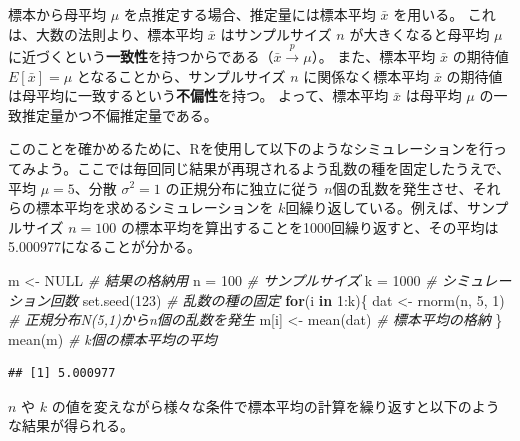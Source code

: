 \documentclass[
  ja=standard, xelatex, base=12pt]{bxjsreport}
\newenvironment{Shaded}{\begin{snugshade}}{\end{snugshade}}
\newcommand{\CommentTok}[1]{\textcolor[rgb]{0.56,0.35,0.01}{\textit{#1}}}
\newcommand{\ConstantTok}[1]{\textcolor[rgb]{0.00,0.00,0.00}{#1}}
\newcommand{\ControlFlowTok}[1]{\textcolor[rgb]{0.13,0.29,0.53}{\textbf{#1}}}
\newcommand{\DecValTok}[1]{\textcolor[rgb]{0.00,0.00,0.81}{#1}}
\newcommand{\FunctionTok}[1]{\textcolor[rgb]{0.00,0.00,0.00}{#1}}
\newcommand{\NormalTok}[1]{#1}
\newcommand{\OtherTok}[1]{\textcolor[rgb]{0.56,0.35,0.01}{#1}}
\newcommand{\SpecialCharTok}[1]{\textcolor[rgb]{0.00,0.00,0.00}{#1}}
\begin{document}
標本から母平均 \(\mu\) を点推定する場合、推定量には標本平均 \(\bar{x}\) を用いる。 これは、大数の法則より、標本平均 \(\bar{x}\) はサンプルサイズ \(n\) が大きくなると母平均 \(\mu\) に近づくという\textbf{一致性}を持つからである（\(\bar{x}\stackrel{p}{\longrightarrow}\mu\)）。 また、標本平均 \(\bar{x}\) の期待値 \(E[\bar{x}]=\mu\) となることから、サンプルサイズ \(n\) に関係なく標本平均 \(\bar{x}\) の期待値は母平均に一致するという\textbf{不偏性}を持つ。 よって、標本平均 \(\bar{x}\) は母平均 \(\mu\) の一致推定量かつ不偏推定量である。

このことを確かめるために、Rを使用して以下のようなシミュレーションを行ってみよう。ここでは毎回同じ結果が再現されるよう乱数の種を固定したうえで、平均 \(\mu=5\)、分散 \(\sigma^2=1\) の正規分布に独立に従う \(n\)個の乱数を発生させ、それらの標本平均を求めるシミュレーションを \(k\)回繰り返している。例えば、サンプルサイズ \(n=100\) の標本平均を算出することを1000回繰り返すと、その平均は5.000977になることが分かる。

\begin{Shaded}
\begin{Highlighting}[]
\NormalTok{m }\OtherTok{\textless{}{-}} \ConstantTok{NULL} \CommentTok{\# 結果の格納用}
\NormalTok{n }\OtherTok{=} \DecValTok{100}   \CommentTok{\# サンプルサイズ}
\NormalTok{k }\OtherTok{=} \DecValTok{1000}  \CommentTok{\# シミュレーション回数}
\FunctionTok{set.seed}\NormalTok{(}\DecValTok{123}\NormalTok{) }\CommentTok{\# 乱数の種の固定}
\ControlFlowTok{for}\NormalTok{(i }\ControlFlowTok{in} \DecValTok{1}\SpecialCharTok{:}\NormalTok{k)\{}
\NormalTok{  dat }\OtherTok{\textless{}{-}} \FunctionTok{rnorm}\NormalTok{(n, }\DecValTok{5}\NormalTok{, }\DecValTok{1}\NormalTok{) }\CommentTok{\# 正規分布N(5,1)からn個の乱数を発生}
\NormalTok{  m[i] }\OtherTok{\textless{}{-}} \FunctionTok{mean}\NormalTok{(dat)     }\CommentTok{\# 標本平均の格納}
\NormalTok{\}}
\FunctionTok{mean}\NormalTok{(m)   }\CommentTok{\# k個の標本平均の平均}
\end{Highlighting}
\end{Shaded}

\begin{verbatim}
## [1] 5.000977
\end{verbatim}

\(n\) や \(k\) の値を変えながら様々な条件で標本平均の計算を繰り返すと以下のような結果が得られる。
\end{document}
